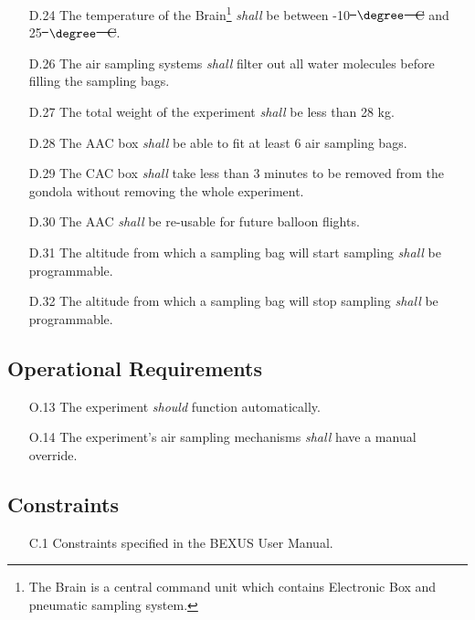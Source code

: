 \documentclass[a4paper,12pt,oneside]{article} %
\providecommand{\DIFaddtex}[1]{{\protect\color{blue}\uwave{#1}}} %
\providecommand{\DIFdeltex}[1]{{\protect\color{red}\sout{#1}}}                      %
\providecommand{\DIFaddbegin}{} %
\providecommand{\DIFaddend}{} %
\providecommand{\DIFdelbegin}{} %
\providecommand{\DIFdelend}{} %
\providecommand{\DIFadd}[1]{\texorpdfstring{\DIFaddtex{#1}}{#1}} %
\providecommand{\DIFdel}[1]{\texorpdfstring{\DIFdeltex{#1}}{}} %
\newcommand{\DIFscaledelfig}{0.5}
\newlength{\DIFdelgraphicswidth} %
\newlength{\DIFdelgraphicsheight} %
\newcommand{\DIFaddincludegraphics}[2][]{{\color{blue}\fbox{\DIFOincludegraphics[#1]{#2}}}} %
\newcommand{\DIFdelincludegraphics}[2][]{%
\sbox{\DIFdelgraphicsbox}{\DIFOincludegraphics[#1]{#2}}%
\settoboxwidth{\DIFdelgraphicswidth}{\DIFdelgraphicsbox} %
\settoboxtotalheight{\DIFdelgraphicsheight}{\DIFdelgraphicsbox} %
\scalebox{\DIFscaledelfig}{%
\parbox[b]{\DIFdelgraphicswidth}{\usebox{\DIFdelgraphicsbox}\\[-\baselineskip] \rule{\DIFdelgraphicswidth}{0em}}\llap{\resizebox{\DIFdelgraphicswidth}{\DIFdelgraphicsheight}{%
\setlength{\unitlength}{\DIFdelgraphicswidth}%
\begin{picture}(1,1)%
\thicklines\linethickness{2pt} %
{\color[rgb]{1,0,0}\put(0,0){\framebox(1,1){}}}%
{\color[rgb]{1,0,0}\put(0,0){\line( 1,1){1}}}%
{\color[rgb]{1,0,0}\put(0,1){\line(1,-1){1}}}%
\end{picture}%
}\hspace*{3pt}}} %
} %
\DeclareRobustCommand{\DIFaddbegin}{\DIFOaddbegin \let\includegraphics\DIFaddincludegraphics} %
\DeclareRobustCommand{\DIFaddend}{\DIFOaddend \let\includegraphics\DIFOincludegraphics} %
\DeclareRobustCommand{\DIFdelbegin}{\DIFOdelbegin \let\includegraphics\DIFdelincludegraphics} %
\DeclareRobustCommand{\DIFdelend}{\DIFOaddend \let\includegraphics\DIFOincludegraphics} %
\begin{document}
\begin{enumerate}
    \item[D.24] The temperature of the Brain\footnote{The Brain is a central command unit which contains Electronic Box and pneumatic sampling system.} \textit{shall} be between -10\DIFdelbegin \DIFdel{\mbox{%
$\degree$
}%
C }\DIFdelend \DIFaddbegin \DIFadd{\mbox{%
$\degree{C}$
}%
}\DIFaddend and 25\DIFdelbegin \DIFdel{\mbox{%
$\degree$
}%
C}\DIFdelend \DIFaddbegin \DIFadd{\mbox{%
$\degree{C}$
}%
}\DIFaddend .
    \item[D.26] The air sampling systems \textit{shall} filter out all water molecules before filling the sampling bags.
    \item[D.27] The total weight of the experiment \textit{shall} be less than 28 kg.
    \item[D.28] The AAC box \textit{shall} be able to fit at least $6$ air sampling bags.
    \item[D.29] The CAC box \textit{shall} take less than 3 minutes to be removed from the gondola without removing the whole experiment.
    \item[D.30] The AAC \textit{shall} be re-usable for future balloon flights.
    \item[D.31] The altitude from which a sampling bag will start sampling \textit{shall} be programmable.
    \item[D.32] The altitude from which a sampling bag will stop sampling \textit{shall} be programmable.
\end{enumerate}
\pagebreak
\pagebreak
\subsection{Operational Requirements}

\begin{enumerate}
    \item[O.13] The experiment \textit{should} function automatically.
    \item[O.14] The experiment's air sampling mechanisms \textit{shall} have a manual override.
\end{enumerate} 
\subsection{Constraints}

\begin{enumerate}
    \item[C.1] Constraints specified in the BEXUS User Manual.
\end{enumerate}
\end{document}
